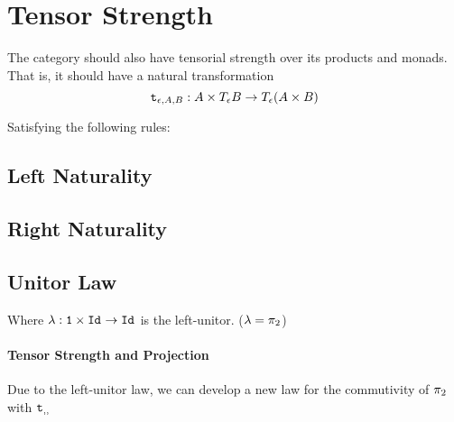 \documentclass{report}
\begin{document}
\section{Tensor Strength}
The category should also have tensorial strength over its products and monads.
That is, it should have a natural transformation
 $$\texttt{t}_{\epsilon, A, B}: A \times T_{\epsilon}{B} \rightarrow T_{\epsilon}{(A \times B)} $$

Satisfying the following rules:
\subsection{Left Naturality}

\subsection{Right Naturality}


\subsection{Unitor Law}
Where $\lambda: \texttt{\texttt{1}} \times \texttt{Id}_{} \rightarrow \texttt{Id}_{}$ is the left-unitor.
($\lambda = \pi_2$)

\paragraph{Tensor Strength and Projection}
Due to the left-unitor law, we can develop a new law for the commutivity of $\pi_2$ with $\texttt{t}_{, , }$
\end{document}
